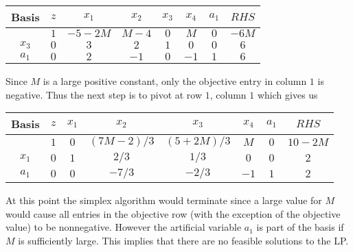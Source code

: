 \documentclass{article}[12pt,a4paper]
\begin{document}
\begin{enumerate}
  \begin{center}
  \begin{tabular}{c | c | c c c c c | c}
  Basis & $z$ & $x_1$ & $x_2$ & $x_3$ & $x_4$ & $a_1$ & $RHS$ \\ \hline
           & $1$ & $-5-2M$ & $M-4$ & $0$ & $M$ & $0$ & $-6M$ \\ \hline
  $x_3$ & $0$ & $3$ & $2$ & $1$ & $0$ & $0$ & $6$ \\
  $a_1$ & $0$ & $2$ & $-1$ & $0$ & $-1$ & $1$ & $6$
  \end{tabular}
  \end{center}
  Since $M$ is a large positive constant, only the objective entry in column $1$ is negative.
  Thus the next step is to pivot at row $1$, column $1$ which gives us
   \begin{center}
  \begin{tabular}{c | c | c c c c c | c}
  Basis & $z$ & $x_1$ & $x_2$ & $x_3$ & $x_4$ & $a_1$ & $RHS$ \\ \hline
           & $1$ & $0$ & $(7M - 2)/3$ & $(5 + 2M)/3$ & $M$ & $0$ & $10-2M$ \\ \hline
  $x_1$ & $0$ & $1$ & $2/3$ & $1/3$ & $0$ & $0$ & $2$ \\
  $a_1$ & $0$ & $0$ & $-7/3$ & $-2/3$ & $-1$ & $1$ & $2$
  \end{tabular}
  \end{center}
  At this point the simplex algorithm would terminate since a large value for $M$ would cause all entries in
  the objective row (with the exception of the objective value) to be nonnegative. 
  However the artificial variable $a_1$ is part of the basis if $M$ is sufficiently large. 
  This implies that there are no feasible solutions to the LP.
  
  \end{enumerate}
\end{document}
